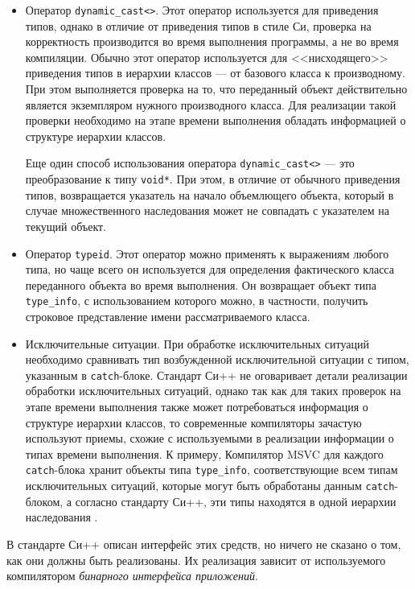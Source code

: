\begin{itemize}
\item Оператор \lstinline{dynamic_cast<>}. Этот оператор используется для приведения типов, однако в отличие от приведения типов в стиле Си, проверка на корректность производится во время выполнения программы, а не во время компиляции. Обычно этот оператор используется для <<нисходящего>> приведения типов в иерархии классов --- от базового класса к производному. При этом выполняется проверка на то, что переданный объект действительно является экземпляром нужного производного класса. Для реализации такой проверки необходимо на этапе времени выполнения обладать информацией о структуре иерархии классов.

    Еще один способ использования оператора \lstinline{dynamic_cast<>} --- это преобразование к типу \lstinline{void*}. При этом, в отличие от обычного приведения типов, возвращается указатель на начало объемлющего объекта, который в случае множественного наследования может не совпадать с указателем на текущий объект.

\item Оператор \lstinline{typeid}. Этот оператор можно применять к выражениям любого типа, но чаще всего он используется для определения фактического класса переданного объекта во время выполнения. Он возвращает объект типа \lstinline{type_info}, с использованием которого можно, в частности, получить строковое представление имени рассматриваемого класса.

\item Исключительные ситуации. При обработке исключительных ситуаций необходимо сравнивать тип возбужденной исключительной ситуации с типом, указанным в \lstinline{catch}-блоке. Стандарт Си++ не оговаривает детали реализации обработки исключительных ситуаций, однако так как для таких проверок на этапе времени выполнения также может потребоваться информация о структуре иерархии классов, то современные компиляторы зачастую используют приемы, схожие с используемыми в реализации информации о типах времени выполнения. К примеру, Компилятор MSVC для каждого \lstinline{catch}-блока хранит объекты типа \lstinline{type_info}, соответствующие всем типам исключительных ситуаций, которые могут быть обработаны данным \lstinline{catch}-блоком, а согласно стандарту Си++, эти типы находятся в одной иерархии наследования \cite{kochhar02}.
\end{itemize}

В стандарте Си++ описан интерфейс этих средств, но ничего не сказано о том, как они должны быть реализованы. Их реализация зависит от используемого компилятором \textit{бинарного интерфейса приложений}.

